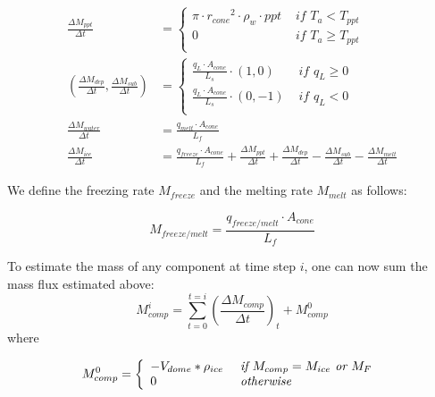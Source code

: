 \documentclass[utf8]{frontiersSCNS}
\begin{document}
\begin{subequations}
	\label{equations}
	\begin{align}
		\label{eq:ppt}
		\frac{\Delta M_{ppt}}{\Delta t}                                    & = \left\{ \begin{array}{ll} \pi \cdot {r_{cone}}^2 \cdot
			\rho_{w}\cdot ppt & \textit{ if } T_{a} < T_{ppt} \\ 0 & \textit{ if } T_{a} \geq T_{ppt} \\\end{array} \right.                                             \\
		\label{eq:vap}
		(\frac{\Delta M_{dep}}{\Delta t}, \frac{\Delta M_{sub}}{\Delta t}) & = \left\{ \begin{array}{ll} \frac{q_{L}
			\cdot A_{cone}}{L_s}\cdot (1,0)  & \textit{ if } q_{L} \geq 0 \\ \frac{q_{L}
			\cdot A_{cone}}{L_s}\cdot (0,-1) & \textit{ if } q_{L} < 0    \\\end{array} \right.                                             \\
		\label{eq:mwat}
		\frac{\Delta M_{water}}{\Delta t}                                  & = \frac{q_{melt} \cdot A_{cone} }{L_f}                                                   \\
		\label{eq:mcone}
		\frac{\Delta M_{ice}}{\Delta t}                                    & = \frac{q_{freeze}\cdot A_{cone} }{L_f} + \frac{\Delta M_{ppt}}{\Delta t} + \frac{\Delta
			M_{dep}}{\Delta t}- \frac{\Delta M_{sub}}{\Delta t}- \frac{\Delta M_{melt}}{\Delta t}
	\end{align}
\end{subequations}

We define the freezing rate $M_{freeze}$ and the melting rate $M_{melt}$ as follows:

\begin{equation}
	M_{freeze/melt} = \frac{q_{freeze/melt} \cdot A_{cone} }{L_f}
	\label{eq:m_freeze/melt}
\end{equation}

To estimate the mass of any component at time step $i$, one can now sum the mass flux estimated above: \begin{equation}
	M_{comp}^i = \sum_{t=0}^{t=i} (\frac{\Delta M_{comp}}{\Delta t})_{t} + M_{comp}^0 \end{equation} where

\begin{equation} M_{comp}^0 = \left\{ \begin{array}{ll} -V_{dome} * \rho_{ice} & \textit{ if } M_{comp}=
             M_{ice}\textit{ or }
             M_{F}                                                 \\ 0 & \textit{ otherwise }\\\end{array} \right. \\
\end{equation}
\end{document}
